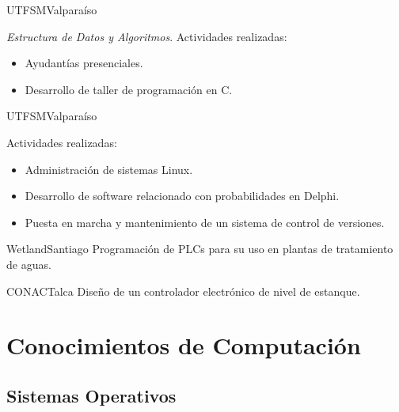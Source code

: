\documentclass[11pt,letterpaper,sans]{moderncv}
\begin{document}
    \pagebreak[0]

      {UTFSM}{Valparaíso}{}
      {
        \emph{Estructura de Datos y Algoritmos}.\newline{}
        Actividades realizadas:
        \begin{itemize}
          \item Ayudantías presenciales.
          \item Desarrollo de taller de programación en C.
        \end{itemize}
      }

    \pagebreak[0]

      {UTFSM}{Valparaíso}{}
      {
        Actividades realizadas:
        \begin{itemize}
          \item Administración de sistemas Linux.
          \item Desarrollo de software relacionado con probabilidades en Delphi.
          \item Puesta en marcha y mantenimiento de un sistema de control de versiones.
        \end{itemize}
      }

    \pagebreak[0]

      {Wetland}{Santiago}{}
      {
        Programación de PLCs para su uso en plantas de tratamiento de aguas.
      }

    \pagebreak[0]

      {CONAC}{Talca}{}
      {
        Diseño de un controlador electrónico de nivel de estanque.
      }

\pagebreak[0]

  \section{Conocimientos de Computación}
    \subsection{Sistemas Operativos}
      \begin{cvcolumns}
      \end{cvcolumns}
\end{document}
